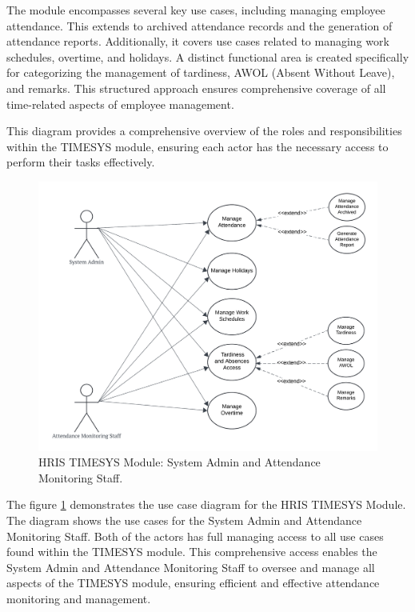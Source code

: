     The module encompasses several key use cases, including managing employee attendance. This extends to archived attendance records and the generation of attendance reports. Additionally, it covers use cases related to managing work schedules, overtime, and holidays. A distinct functional area is created specifically for categorizing the management of tardiness, AWOL (Absent Without Leave), and remarks. This structured approach ensures comprehensive coverage of all time-related aspects of employee management.

    This diagram provides a comprehensive overview of the roles and responsibilities within the TIMESYS module, ensuring each actor has the necessary access to perform their tasks effectively.
    
    \begin{figure}[H]
        \centering
        \includegraphics[width=0.9\linewidth]{figures/images/use-case-time-1.png}
        \caption{HRIS TIMESYS Module: System Admin and Attendance Monitoring Staff.}
        \label{fig:use-case-time-1}
    \end{figure}

    The figure \ref{fig:use-case-time-1} demonstrates the use case diagram for the HRIS TIMESYS Module. The diagram shows the use cases for the System Admin and Attendance Monitoring Staff. Both of the actors has full managing access to all use cases found within the TIMESYS module. This comprehensive access enables the System Admin and Attendance Monitoring Staff to oversee and manage all aspects of the TIMESYS module, ensuring efficient and effective attendance monitoring and management.

